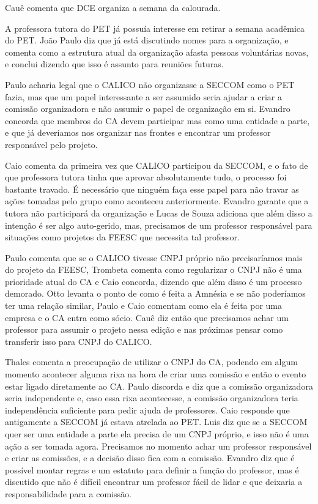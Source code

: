 \documentclass{ata-calico}
\begin{document}
Cauê comenta que DCE organiza a semana da calourada.

A professora tutora do PET já possuía interesse em retirar a semana acadêmica do PET. João Paulo diz que já está discutindo nomes para a organização, e comenta como a estrutura atual da organização afasta pessoas voluntárias novas, e conclui dizendo que isso é assunto para reuniões futuras. 

Paulo acharia legal que o CALICO não organizasse a SECCOM como o PET fazia, mas que um papel interessante a ser assumido seria ajudar a criar a comissão organizadora e não assumir o papel de organização em si. Evandro concorda que membros do CA devem participar mas como uma entidade a parte, e que já deveríamos nos organizar nas frontes e encontrar um professor responsável pelo projeto. 

Caio comenta da primeira vez que CALICO participou da SECCOM, e o fato de que professora tutora tinha que aprovar absolutamente tudo, o processo foi bastante travado. É necessário que ninguém faça esse papel para não travar as ações tomadas pelo grupo como aconteceu anteriormente. Evandro garante que a tutora não participará da organização e Lucas de Souza adiciona que além disso a intenção é ser algo auto-gerido, mas, precisamos de um professor responsável para situações como projetos da FEESC que necessita tal professor.

Paulo comenta que se o CALICO tivesse CNPJ próprio não precisaríamos mais do projeto da FEESC, Trombeta comenta como regularizar o CNPJ não é uma prioridade atual do CA e Caio concorda, dizendo que além disso é um processo demorado.  Otto levanta o ponto de como é feita a Amnésia e se não poderíamos ter uma relação similar, Paulo e Caio comentam como ela é feita por uma empresa e o CA entra como sócio. Cauê diz então que precisamos achar um professor para assumir o projeto nessa edição e nas próximas pensar como transferir isso para CNPJ do CALICO. 

Thales comenta a preocupação de utilizar o CNPJ do CA, podendo em algum momento acontecer alguma rixa na hora de criar uma comissão e então o evento estar ligado diretamente ao CA. Paulo discorda e diz que a comissão organizadora seria independente e, caso essa rixa acontecesse, a comissão organizadora teria independência suficiente para pedir ajuda de professores. Caio responde que antigamente a SECCOM já estava atrelada ao PET. Luis diz que se a SECCOM quer ser uma entidade a parte ela precisa de um CNPJ próprio, e isso não é uma ação a ser tomada agora. Precisamos no momento achar um professor responsável e criar as comissões, e a decisão disso fica com a comissão. Evandro diz que é possível montar regras e um estatuto para definir a função do professor, mas é discutido que não é difícil encontrar um professor fácil de lidar e que deixaria a responsabilidade para a comissão. 
\end{document}
